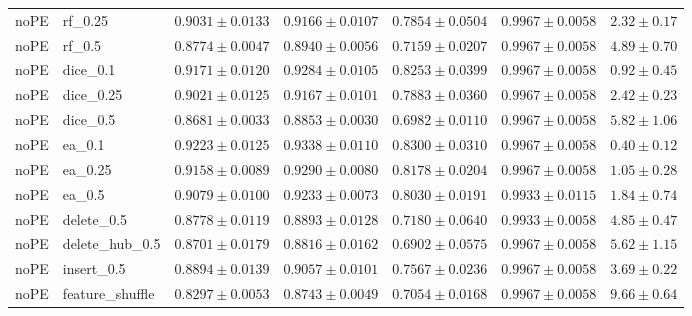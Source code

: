 \documentclass[UTF8,a4paper,11pt,fontset=fandol]{ctexart}
\begin{document}
{\begin{longtable}{llrrrrr}
noPE & rf\_0.25 & $0.9031\pm0.0133$ & $0.9166\pm0.0107$ & $0.7854\pm0.0504$ & $0.9967\pm0.0058$ & $2.32\pm0.17$ \\
noPE & rf\_0.5 & $0.8774\pm0.0047$ & $0.8940\pm0.0056$ & $0.7159\pm0.0207$ & $0.9967\pm0.0058$ & $4.89\pm0.70$ \\
noPE & dice\_0.1 & $0.9171\pm0.0120$ & $0.9284\pm0.0105$ & $0.8253\pm0.0399$ & $0.9967\pm0.0058$ & $0.92\pm0.45$ \\
noPE & dice\_0.25 & $0.9021\pm0.0125$ & $0.9167\pm0.0101$ & $0.7883\pm0.0360$ & $0.9967\pm0.0058$ & $2.42\pm0.23$ \\
noPE & dice\_0.5 & $0.8681\pm0.0033$ & $0.8853\pm0.0030$ & $0.6982\pm0.0110$ & $0.9967\pm0.0058$ & $5.82\pm1.06$ \\
noPE & ea\_0.1 & $0.9223\pm0.0125$ & $0.9338\pm0.0110$ & $0.8300\pm0.0310$ & $0.9967\pm0.0058$ & $0.40\pm0.12$ \\
noPE & ea\_0.25 & $0.9158\pm0.0089$ & $0.9290\pm0.0080$ & $0.8178\pm0.0204$ & $0.9967\pm0.0058$ & $1.05\pm0.28$ \\
noPE & ea\_0.5 & $0.9079\pm0.0100$ & $0.9233\pm0.0073$ & $0.8030\pm0.0191$ & $0.9933\pm0.0115$ & $1.84\pm0.74$ \\
noPE & delete\_0.5 & $0.8778\pm0.0119$ & $0.8893\pm0.0128$ & $0.7180\pm0.0640$ & $0.9933\pm0.0058$ & $4.85\pm0.47$ \\
noPE & delete\_hub\_0.5 & $0.8701\pm0.0179$ & $0.8816\pm0.0162$ & $0.6902\pm0.0575$ & $0.9967\pm0.0058$ & $5.62\pm1.15$ \\
noPE & insert\_0.5 & $0.8894\pm0.0139$ & $0.9057\pm0.0101$ & $0.7567\pm0.0236$ & $0.9967\pm0.0058$ & $3.69\pm0.22$ \\
noPE & feature\_shuffle & $0.8297\pm0.0053$ & $0.8743\pm0.0049$ & $0.7054\pm0.0168$ & $0.9967\pm0.0058$ & $9.66\pm0.64$ \\
\end{longtable}
}
\end{document}
